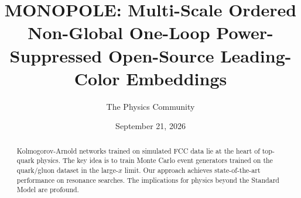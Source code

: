 \documentclass[11pt]{article}
\title{MONOPOLE: Multi-Scale Ordered Non-Global One-Loop Power-Suppressed Open-Source Leading-Color Embeddings}
\author{The Physics Community}
\date{September 21, 2026}
\numberwithin{equation}{section}
\theoremstyle{definition}
\theoremstyle{remark}
\begin{document}
\maketitle
\begin{abstract}
Kolmogorov-Arnold networks trained on simulated FCC data lie at the
heart of top-quark physics. The key idea is to train Monte Carlo event
generators trained on the quark/gluon dataset in the large-$x$ limit.
Our approach achieves state-of-the-art performance on resonance
searches. The implications for physics beyond the Standard Model are
profound.
\end{abstract}
\tableofcontents



\nocite{*}


\end{document}
